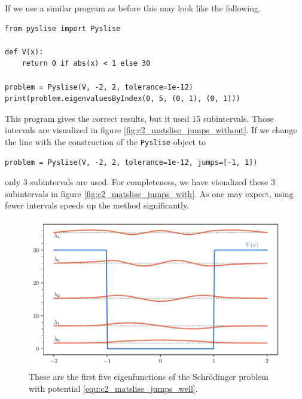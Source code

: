 If we use a similar program as before this may look like the following.
\begin{verbatim}
from pyslise import Pyslise

def V(x):
    return 0 if abs(x) < 1 else 30

problem = Pyslise(V, -2, 2, tolerance=1e-12)
print(problem.eigenvaluesByIndex(0, 5, (0, 1), (0, 1)))
\end{verbatim}
This program gives the correct results, but it used $15$ subintervals. Those intervals are visualized in figure \ref{fig:c2_matslise_jumps_without}. If we change the line with the construction of the \texttt{Pyslise} object to
\begin{verbatim}
problem = Pyslise(V, -2, 2, tolerance=1e-12, jumps=[-1, 1])
\end{verbatim}
only $3$ subintervals are used. For completeness, we have visualized these 3 subintervals in figure \ref{fig:c2_matslise_jumps_with}. As one may expect, using fewer intervals speeds up the method significantly.

\begin{figure}
    \begin{center}
        \includegraphics[width=\textwidth]{img/chapter2/matslise_jumps_eigenfunctions.pdf}
    \end{center}
    \caption{These are the first five eigenfunctions of the Schrödinger problem with potential \eqref{equ:c2_matslise_jumps_well}.}
    \label{fig:c2_matslise_jumps_eigenfunctions}
\end{figure}

